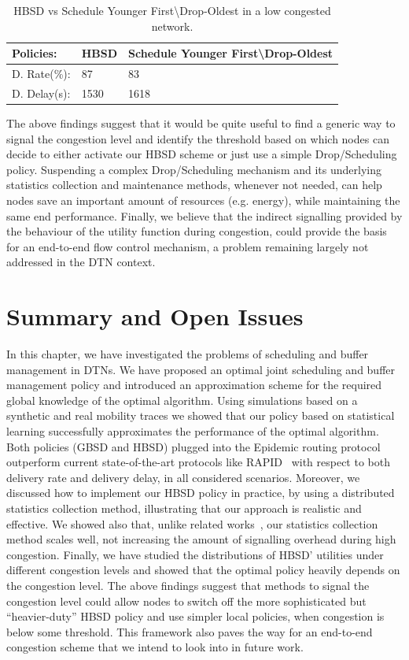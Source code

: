 \begin{table}[!h]
\renewcommand{\arraystretch}{1.1}
\caption{HBSD vs Schedule Younger First\textbackslash Drop-Oldest in a low congested network.}
\centering
\footnotesize
\begin{tabular}{|p{1.8cm}||p{2cm}||p{6cm}|}
\hline
\bfseries Policies: & HBSD & Schedule Younger First\textbackslash Drop-Oldest\\
\hline\hline
D. Rate(\%):&87&83\\
\hline\hline
D. Delay(s):&1530&1618\\
\hline
\end{tabular}
\label{DO-HBSD-LC}
\end{table}

The above findings suggest that it would be quite useful to find a generic way to signal the congestion level and identify the threshold based on which nodes can decide to either activate our HBSD scheme or just use a simple Drop/Scheduling policy. Suspending a complex Drop/Scheduling mechanism and its underlying statistics collection and maintenance methods, whenever not needed, can help nodes save an important amount of resources (e.g. energy), while maintaining the same end performance. Finally, we believe that the indirect signalling provided by the behaviour of the utility function during congestion, could provide the basis for an end-to-end flow control mechanism, a problem remaining largely not addressed in the DTN context.

\section{Summary and Open Issues}
\label{sec:conclusion}

In this chapter, we have investigated the problems of scheduling and buffer management in DTNs. We have proposed an optimal joint scheduling and buffer management policy and introduced an approximation scheme for the required global knowledge of the optimal algorithm. Using simulations based on a synthetic and real mobility traces we showed that our policy based on statistical learning successfully approximates the performance of the optimal algorithm. Both policies (GBSD and HBSD) plugged into the Epidemic routing protocol
outperform current state-of-the-art protocols like RAPID~\cite{Levine:Sigcomm07} with respect to both delivery rate and delivery delay, in all considered scenarios. Moreover, we discussed how to implement our HBSD policy in practice, by using a distributed statistics collection method, illustrating that our approach is realistic and effective. We showed also that, unlike related works~\cite{Levine:Sigcomm07, AOBM}, our statistics collection method scales well, not increasing the amount of signalling overhead during high congestion. Finally, we have studied the distributions of HBSD' utilities under different congestion levels and showed that the optimal policy heavily depends on the congestion level. The above findings suggest that methods to signal the congestion level could allow nodes to switch off the more sophisticated but ``heavier-duty'' HBSD policy and use simpler local policies, when congestion is below some threshold. This framework also paves the way for an end-to-end congestion scheme that we intend to look into in future work.
